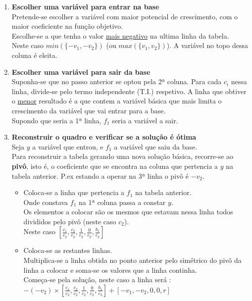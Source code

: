 \documentclass[]{report}
\begin{document}
\begin{enumerate}
\item \textbf{Escolher uma variável para entrar na base}\\
Pretende-se escolher a variável com maior potencial de crescimento, com o maior coeficiente na função objetivo.\\
Escolhe-se a que tenha o valor \underline{mais negativo} na ultima linha da tabela.\\
Neste caso $min(\{-v_1, -v_2\})$ (ou $max(\{v_1, v_2\})$). A variável no topo dessa coluna é eleita.
\item \textbf{Escolher uma variável para sair da base}\\
Suponha-se que no passo anterior se optou pela 2ª coluna. Para cada $c_i$ nessa linha, divide-se pelo termo independente (T.I.) respetivo. A linha que obtiver o \underline{menor} resultado é a que contem a variável básica que mais limita o crescimento da variável que vai entrar para a base.\\
Supondo que seria a 1ª linha, $f_1$ seria a variável a sair.
\item \textbf{Reconstruir o quadro e verificar se a solução é ótima}\\
Seja $y$ a variável que entrou, e $f_1$ a variável que saiu da base.\\
Para reconstruir a tabela gerando uma nova solução básica, recorre-se ao \textbf{pivô}, isto é, o coeficiente que se encontra na coluna que pertencia a $y$ na tabela anterior. P.ex estando a operar na 3ª linha o pivô é $-v_2$.
\begin{itemize}
\item Coloca-se a linha que pertencia a $f_1$ na tabela anterior.\\
Onde constava $f_1$ na 1ª coluna passa a constar $y$.\\
Os elementos a colocar são os mesmos que estavam nessa linha todos divididos pelo pivô (neste caso $c_2$).\\
Neste caso $[\frac{c_1}{c_2},\frac{c_2}{c_2},\frac{1}{c_2},\frac{0}{c_2},\frac{b_1}{c_2}]$\\
\item Coloca-se as restantes linhas.\\
Multiplica-se a linha obtida no ponto anterior pelo simétrico do pivô da linha a colocar e soma-se os valores que a linha continha.\\
Começa-se pela solução, neste caso a linha será : $-(-v_2) \times[\frac{c_1}{c_2},\frac{c_2}{c_2},\frac{1}{c_2},\frac{0}{c_2},\frac{b_1}{c_2}] + [-v_1,-v_2, 0,0, r]$

\end{itemize}
\end{enumerate}
\end{document}
